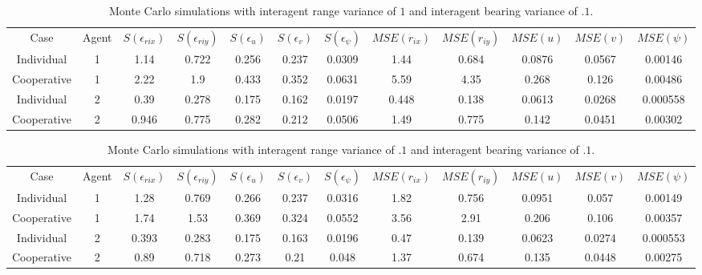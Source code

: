 \documentclass{aiaa-tc}
\begin{document}
\begin{table}[tb!]
\scriptsize
\centering
\begin{tabular}{c|c|c|c|c|c|c|c|c|c|c|c|}
Case & Agent & $S(\epsilon_{rix})$ & $S(\epsilon_{riy})$ & $S(\epsilon_{u})$ & $S(\epsilon_{v})$ & $S(\epsilon_{\psi})$ & $MSE(r_{ix})$ & $MSE(r_{iy})$ & $MSE(u)$ & $MSE(v)$ & $MSE(\psi)$ \\
Individual & 1& 1.14& 0.722& 0.256& 0.237& 0.0309& 1.44& 0.684& 0.0876& 0.0567& 0.00146 \\
Cooperative & 1& 2.22& 1.9& 0.433& 0.352& 0.0631& 5.59& 4.35& 0.268& 0.126& 0.00486 \\
Individual & 2& 0.39& 0.278& 0.175& 0.162& 0.0197& 0.448& 0.138& 0.0613& 0.0268& 0.000558 \\
Cooperative & 2& 0.946& 0.775& 0.282& 0.212& 0.0506& 1.49& 0.775& 0.142& 0.0451& 0.00302 \\
\end{tabular}
\caption{Monte Carlo simulations with interagent range variance of $1$ and interagent bearing variance of $.1$.}
\label{tab:sig_ar1_ab_.1}
\end{table}

\begin{table}[tb!]
\scriptsize
\centering
\begin{tabular}{c|c|c|c|c|c|c|c|c|c|c|c|}
Case & Agent & $S(\epsilon_{rix})$ & $S(\epsilon_{riy})$ & $S(\epsilon_{u})$ & $S(\epsilon_{v})$ & $S(\epsilon_{\psi})$ & $MSE(r_{ix})$ & $MSE(r_{iy})$ & $MSE(u)$ & $MSE(v)$ & $MSE(\psi)$ \\
Individual & 1& 1.28& 0.769& 0.266& 0.237& 0.0316& 1.82& 0.756& 0.0951& 0.057& 0.00149 \\
Cooperative & 1& 1.74& 1.53& 0.369& 0.324& 0.0552& 3.56& 2.91& 0.206& 0.106& 0.00357 \\
Individual & 2& 0.393& 0.283& 0.175& 0.163& 0.0196& 0.47& 0.139& 0.0623& 0.0274& 0.000553 \\
Cooperative & 2& 0.89& 0.718& 0.273& 0.21& 0.048& 1.37& 0.674& 0.135& 0.0448& 0.00275 \\
\end{tabular}
\caption{Monte Carlo simulations with interagent range variance of $.1$ and interagent bearing variance of $.1$.}
\label{tab:sig_ar.1_ab_.1}
\end{table}
\end{document}
